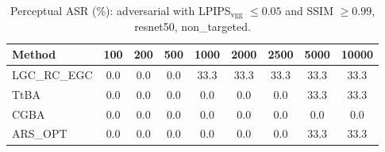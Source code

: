 \begin{table}[t]
\centering\footnotesize
\caption{Perceptual ASR (\%): adversarial with LPIPS$_{\mathrm{vgg}}$ $\le 0.05$ and SSIM $\ge 0.99$, resnet50, non\_targeted.}
\begin{tabular}{lcccccccc}
\toprule
Method & 100 & 200 & 500 & 1000 & 2000 & 2500 & 5000 & 10000 \\
\midrule
LGC\_RC\_EGC & 0.0 & 0.0 & 0.0 & 33.3 & 33.3 & 33.3 & 33.3 & 33.3 \\
TtBA & 0.0 & 0.0 & 0.0 & 0.0 & 0.0 & 0.0 & 33.3 & 33.3 \\
CGBA & 0.0 & 0.0 & 0.0 & 0.0 & 0.0 & 0.0 & 0.0 & 0.0 \\
ARS\_OPT & 0.0 & 0.0 & 0.0 & 0.0 & 0.0 & 0.0 & 33.3 & 33.3 \\
\bottomrule
\end{tabular}
\end{table}
